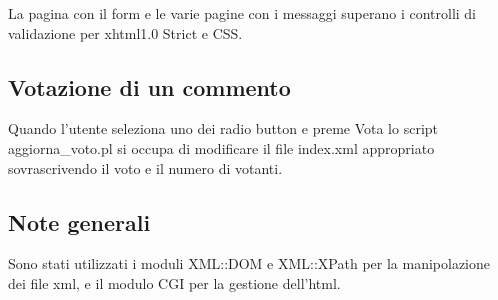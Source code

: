 \documentclass[a4paper,10pt]{article}
\begin{document}
La pagina con il form e le varie pagine con i messaggi superano i controlli di validazione per xhtml1.0 Strict e CSS.

\subsection{Votazione di un commento}

Quando l'utente seleziona uno dei radio button e preme Vota lo script aggiorna{\_}voto.pl si occupa di modificare il file index.xml appropriato sovrascrivendo il voto e il numero di votanti.

\subsection{Note generali}
Sono stati utilizzati i moduli XML::DOM e XML::XPath per la manipolazione dei file xml, e il modulo CGI per la gestione dell'html.
\end{document}
